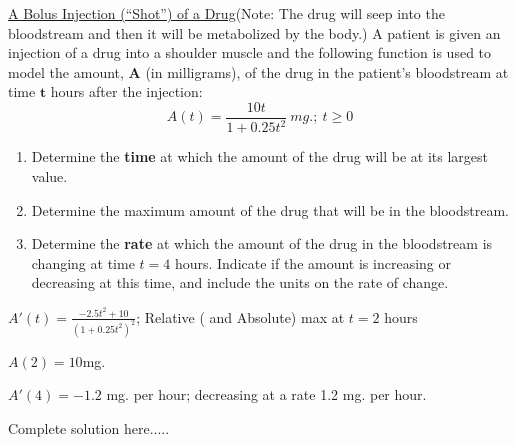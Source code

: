 \begin{example}
\underline{A Bolus Injection (“Shot”) of a Drug}(Note:  The drug will seep into the bloodstream and then it will be metabolized by the body.)  A patient is given an injection of a drug into a shoulder muscle and the following function is used to model the amount, $\bm{A}$ (in milligrams), of the drug in the patient’s bloodstream at time $\bm{t}$ hours after the injection:
\begin{equation*}
    A(t)=\frac{10t}{1+0.25t^2}\ mg.;\ t\ge 0
\end{equation*}
\renewcommand{\labelenumi}{(\alph{enumi})}
\begin{enumerate}[leftmargin=*]
    \item Determine the \textbf{time} at which the amount of the drug will be at its largest value. 
    \item Determine the maximum amount of the drug that will be in the bloodstream. 
    \item Determine the \textbf{rate} at which the amount of the drug in the bloodstream is changing at time $t=4$ hours.  Indicate if the amount is increasing or decreasing at this time, and include the units on the rate of change.
\end{enumerate}
    \begin{sol}
   \begin{enumInline1}
   \item $A'(t)=\displaystyle\frac{-2.5t^2+10}{(1+0.25t^2)^2}$; Relative ( and Absolute) max at $t=2$ hours 
   \item $A(2)=10$mg.  
   \item  $A'(4)=-1.2$ mg. per hour; decreasing at a rate 1.2 mg. per hour.
   \end{enumInline1}
    \end{sol}
    \begin{solL}
    Complete solution here.....
    
    \end{solL}
    
\end{example}
\newpage
